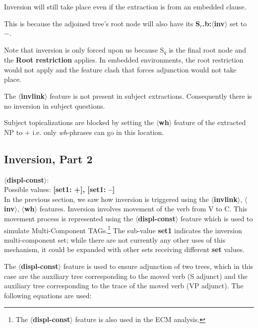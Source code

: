 Inversion will still take place even if the extraction is from an embedded
clause.


This is because the adjoined tree's root node will also have its 
{\bf S$_{r}$.b:$\langle$inv$\rangle$} set to $-$. 


Note that inversion is only forced upon us because S$_{q}$ is the
final root node and the {\bf Root restriction} applies. In embedded
environments, the root restriction would not apply and the feature
clash that forces adjunction would not take place.

The {\bf $\langle$invlink$\rangle$} feature is not present in subject
extractions.  Consequently there is no inversion in subject questions.

Subject topicalizations are blocked by setting the 
{\bf $\langle$wh$\rangle$} feature of the extracted NP to $+$ i.e. only
{\em wh}-phrases can go in this location. 

\subsection{Inversion, Part 2}

{\bf $\langle$displ-const$\rangle$}:\\ Possible values: {\bf [set1:
+], [set1: --]}\\ In the previous section, we saw how inversion is
triggered using the {\bf $\langle$invlink$\rangle$}, {\bf
$\langle$inv$\rangle$}, {\bf $\langle$wh$\rangle$} features. Inversion
involves movement of the verb from V to C. This movement process is
represented using the {\bf $\langle$displ-const$\rangle$} feature
which is used to simulate Multi-Component TAGs.\footnote{The {\bf
$\langle$displ-const$\rangle$} feature is also used in the ECM
analysis.} The sub-value {\bf set1} indicates the inversion
multi-component set; while there are not currently any other uses of
this mechanism, it could be expanded with other sets receiving
different {\bf set} values.

The {\bf $\langle$displ-const$\rangle$} feature is used to ensure
adjunction of two trees, which in this case are the auxiliary
tree corresponding to the moved verb (S adjunct) and the auxiliary tree
corresponding to the trace of the moved verb (VP adjunct). The following
equations are used:



